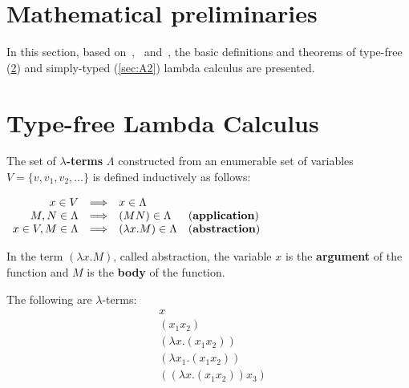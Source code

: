 \section{Mathematical preliminaries} \label{tex:math_prelim}

\cite{Church:1940:A-formulation-of-the-simple-theory-of-types}


In this section, based on~\cite{Barendregt:1981:The-Lambda-Calculus:-Its-Syntax-and-Semantics},~\cite{Barendregt:1992:Lambda-Calculi-with-Types} and~\cite{HindleySeldin:2008:Lambda-Calculus-and-Combinators-an-Introduction}, the basic definitions and theorems of type-free (\ref{sec:A1}) and simply-typed (\ref{sec:A2}) lambda calculus are presented. 

\section{Type-free Lambda Calculus} \label{sec:A1}

\begin{definition} The set of \textbf{$\lambda$-terms} $\Lambda$ constructed from an enumerable set of variables $V = \{ v, v_1 ,v_2, \dots\}$ is defined inductively as follows:
\begin{center}
$
\begin{array}{rcll}
x \in V & \Longrightarrow & x \in \Lambda &\\
M,N \in \Lambda &  \Longrightarrow & (MN) \in \Lambda & \text{(\textbf{application})}\\ 
 x \in V, M \in \Lambda&  \Longrightarrow  & (\lambda x.M) \in \Lambda & \text{(\textbf{abstraction})}
\end{array} 
$
\end{center}
\end{definition}

In the term $ (\lambda x.M)$, called abstraction, the variable $x$ is the \textbf{argument} of the function and $M$ is the \textbf{body} of the function. %

\begin{example} \label{app:ex1} The following are $\lambda$-terms:
\begin{align*}
& x \\
& (x_1x_2) \\
& (\lambda x. (x_1 x_2)) \\
& (\lambda x_1. (x_1 x_2)) \\
& ((\lambda x. (x_1 x_2)) x_3 ) 
\end{align*}
\end{example}


